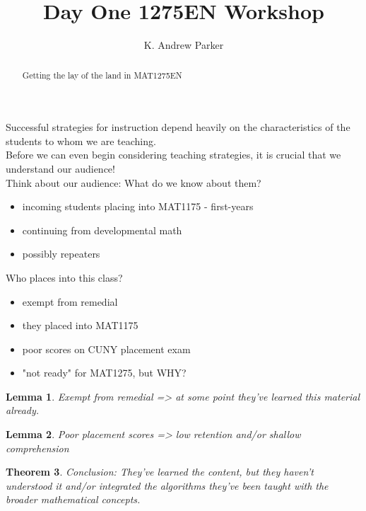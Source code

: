 \documentclass{ximera}
\title{Day One 1275EN Workshop}
\author{K. Andrew Parker}
\newtheorem{theorem}{Theorem}[section]
\newtheorem{lemma}[theorem]{Lemma}
\begin{document}
\begin{abstract}
Getting the lay of the land in MAT1275EN
\end{abstract}

\maketitle

Successful strategies for instruction depend heavily on the characteristics of the students to whom we are teaching.\\

Before we can even begin considering teaching strategies, it is crucial that we understand our audience! \\


Think about our audience: What do we know about them?
\begin{itemize}
\item incoming students placing into MAT1175 - first-years
\item continuing from developmental math
\item possibly repeaters
\end{itemize}

Who places into this class?
\begin{itemize}
\item exempt from remedial
\item they placed into MAT1175
\item poor scores on CUNY placement exam
\item "not ready" for MAT1275, but WHY?
\end{itemize}

\begin{lemma}
Exempt from remedial => at some point they've learned this material already. \\
\end{lemma}

\begin{lemma}
Poor placement scores => low retention and/or shallow comprehension \\
\end{lemma}

\begin{theorem}
Conclusion: They've learned the content, but they haven't understood it
and/or integrated the algorithms they've been taught with the broader
mathematical concepts.\\
\end{theorem}
\end{document}
